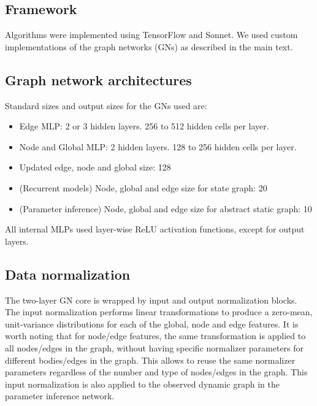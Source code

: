 \subsection{Framework}
\label{sm:sec:framework}

Algorithms were implemented using TensorFlow and Sonnet. We used custom implementations of the graph networks (GNs) as described in the main text.

\subsection{Graph network architectures}
\label{sm:sec:architectures}
Standard sizes and output sizes for the GNs used are:

\begin{itemize}

\item Edge MLP: 2 or 3 hidden layers. 256 to 512 hidden cells per layer.
\item Node and Global MLP: 2 hidden layers. 128 to 256 hidden cells per layer.
\item Updated edge, node and global size: 128
\item (Recurrent models) Node, global and edge size for state graph: 20
\item (Parameter inference) Node, global and edge size for abstract static graph: 10

\end{itemize}


All internal MLPs used layer-wise ReLU activation functions, except for output layers.

\subsection{Data normalization}
\label{sm:sec:normalization}

The two-layer GN core is wrapped by input and output normalization blocks. The input normalization performs linear transformations to produce a zero-mean, unit-variance distributions for each of the global, node and edge features. It is worth noting that for node/edge features, the same transformation is applied to all nodes/edges in the graph, without having specific normalizer parameters for different bodies/edges in the graph. This allows to reuse the same normalizer parameters regardless of the number and type of nodes/edges in the graph. This input normalization is also applied to the observed dynamic graph in the parameter inference network.  

